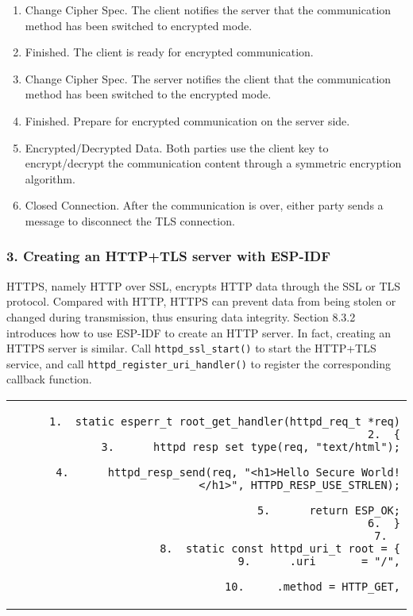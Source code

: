\documentclass[a4paper,12pt]{book}
\begin{document}
\begin{enumerate}[label=(\arabic*)]
    \item Change Cipher Spec. The client notifies the server that the communication method has been switched to encrypted mode.
    \item Finished. The client is ready for encrypted communication.
    \item Change Cipher Spec. The server notifies the client that the communication method has been switched to the encrypted mode.
    \item Finished. Prepare for encrypted communication on the server side.
    \item Encrypted/Decrypted Data. Both parties use the client key to encrypt/decrypt the communication content through a symmetric encryption algorithm.
    \item Closed Connection. After the communication is over, either party sends a message to disconnect the TLS connection.
\end{enumerate}

\subsubsection{3. Creating an HTTP+TLS server with ESP-IDF}
HTTPS, namely HTTP over SSL, encrypts HTTP data through the SSL or TLS protocol. Compared with HTTP, HTTPS can prevent data from being stolen or changed during transmission, thus ensuring data integrity. Section 8.3.2 introduces how to use ESP-IDF to create an HTTP server. In fact, creating an HTTPS server is similar. Call \verb|httpd_ssl_start()| to start the HTTP+TLS service, and call \verb|httpd_register_uri_handler()| to register the corresponding callback function.


\begin{codebloc}
\begin{tabular}{d}
\vspace{2pt}
\begin{verbatim}
1.  static esperr_t root_get_handler(httpd_req_t *req)
2.  {
3.      httpd_resp_set_type(req, "text/html");
\end{verbatim}
\verb|4.      |\fontsize{9pt}{10pt}\selectfont\verb|httpd_resp_send(req, "<h1>Hello Secure World! </h1>", HTTPD_RESP_USE_STRLEN);|
\footnotesize
\begin{verbatim}
5.      return ESP_OK;
6.  }
7.	
8.  static const httpd_uri_t root = {
9.      .uri       = "/",
\end{verbatim}
\verb|10.     .method = HTTP_GET,|
\end{tabular}
\end{codebloc}
\end{document}
